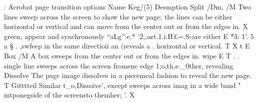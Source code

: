 
: Acrobat page transition options 
Name Keg/(5) Desmption 
Split /Dm, /M Two lines sweep across the screen to show the new page; the lines can be either 
horizontal or vertical and can move from the center out or from the edges in. 
X green, appear and synchronously 
``aLg'':e.* '2,;a¢t.1.i.H£=.S-are either 
E 
*3: 
1’. 
5 
a 
§ 
. ,swfeep in the same directioii an (reveals a 
. horizontal or vertical. T X t E 
Box /M A box sweeps from the center out or from the edges in. 
wipe E T . . single line sweeps across the screen fromene edge 1;o,th,e._0ther, revealing 
Dissolve The page image dissolves in a piecemeal fashion to reveal the new page. 
T Gitttteil Similar t_o,Dissoive', except sweeps across imag in a wide band 
" mtponegside of the screensto themher; '. X 
